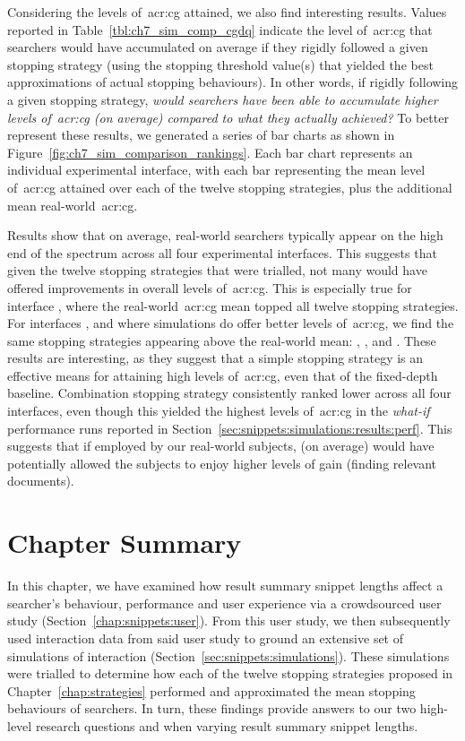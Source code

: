 Considering the levels of~\gls{acr:cg} attained, we also find interesting results. Values reported in Table~\ref{tbl:ch7_sim_comp_cgdq} indicate the level of~\gls{acr:cg} that searchers would have accumulated on average if they rigidly followed a given stopping strategy (using the stopping threshold value(s) that yielded the best approximations of actual stopping behaviours). In other words, if rigidly following a given stopping strategy, \emph{would searchers have been able to accumulate higher levels of~\gls{acr:cg} (on average) compared to what they actually achieved?} To better represent these results, we generated a series of bar charts as shown in Figure~\ref{fig:ch7_sim_comparison_rankings}. Each bar chart represents an individual experimental interface, with each bar representing the mean level of~\gls{acr:cg} attained over each of the twelve stopping strategies, plus the additional mean real-world~\gls{acr:cg}.

Results show that on average, real-world searchers typically appear on the high end of the spectrum across all four experimental interfaces. This suggests that given the twelve stopping strategies that were trialled, not many would have offered improvements in overall levels of~\gls{acr:cg}. This is especially true for interface , where the real-world~\gls{acr:cg} mean topped all twelve stopping strategies. For interfaces ,  and  where simulations do offer better levels of~\gls{acr:cg}, we find the same stopping strategies appearing above the real-world mean: , ,  and . These results are interesting, as they suggest that a simple stopping strategy is an effective means for attaining high levels of~\gls{acr:cg}, even that of the fixed-depth baseline. Combination stopping strategy  consistently ranked lower across all four interfaces, even though this yielded the highest levels of~\gls{acr:cg} in the \emph{what-if} performance runs reported in Section~\ref{sec:snippets:simulations:results:perf}. This suggests that if employed by our real-world subjects,  (on average) would have potentially allowed the subjects to enjoy higher levels of gain (finding relevant documents).

\section{Chapter Summary}
In this chapter, we have examined how result summary snippet lengths affect a searcher's behaviour, performance and user experience via a crowdsourced user study (Section~\ref{chap:snippets:user}). From this user study, we then subsequently used interaction data from said user study to ground an extensive set of simulations of interaction (Section~\ref{sec:snippets:simulations}). These simulations were trialled to determine how each of the twelve stopping strategies proposed in Chapter~\ref{chap:strategies} performed and approximated the mean stopping behaviours of searchers. In turn, these findings provide answers to our two high-level research questions  and  when varying result summary snippet lengths.

